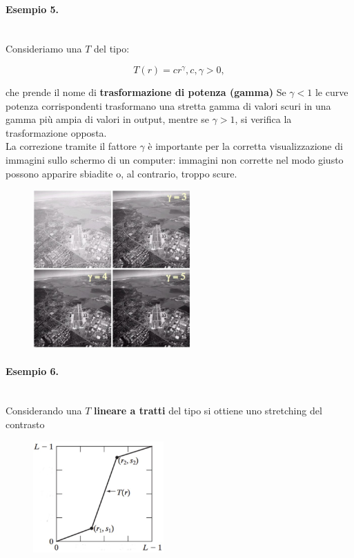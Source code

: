 \paragraph{Esempio 5.}\ \\

Consideriamo una $T$ del tipo:

$$
    T(r) = cr^\gamma, c, \gamma > 0,
$$

che prende il nome di \textbf{trasformazione di potenza (gamma)}
Se $\gamma < 1$ le curve potenza corrispondenti trasformano una stretta
gamma di valori scuri in una gamma più ampia di valori in output,
mentre se $\gamma > 1$, si verifica la trasformazione opposta.\\
La correzione tramite il fattore $\gamma$ è importante per la corretta
visualizzazione di immagini sullo schermo di un computer:
immagini non corrette nel modo giusto possono apparire sbiadite o,
al contrario, troppo scure.

\begin{figure}[H]
    \centering
    \includegraphics[width=6cm, keepaspectratio]{capitoli/immagini/imgs/foto_esempio_5.jpg}
\end{figure}

\paragraph{Esempio 6.}\ \\

Considerando una $T$ \textbf{lineare a tratti} del tipo si ottiene uno
stretching del contrasto

\begin{figure}[H]
    \centering
    \includegraphics[width=5cm, keepaspectratio]{capitoli/immagini/imgs/lineare_a_tratti_esempio_6.jpg}
\end{figure}

